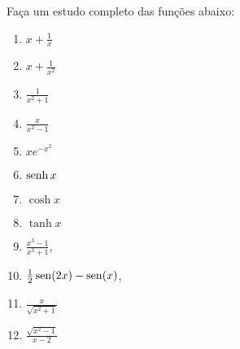 \begin{exo}\label{Exo:EstudosBasicos}
Faça um estudo completo das funções abaixo:
\begin{multicols}{3}
\begin{enumerate}
\item\label{itEstBas1} $x+\frac{1}{x}$
\item\label{itEstBas6} $x+\frac{1}{x^2}$
\item\label{itEstBas9} $\frac{1}{x^2+1}$
\item\label{itEstBas2} $\frac{x}{x^2-1}$
\item\label{itEstBas3} $xe^{-x^2}$
\item\label{itEstBas7} $\operatorname{senh} x$
\item\label{itEstBas8} $\cosh x$
\item\label{itEstBas8t} $\tanh x$
\item\label{itEstBas13} $\frac{x^3-1}{x^3+1}$, 
\item\label{itEstBas14} $\tfrac12\operatorname{sen} (2x)-\operatorname{sen}(x)$, 
\item\label{itEstBas15} $\frac{x}{\sqrt{x^2+1}}$
\item\label{itEstFuncB30} $\frac{\sqrt{x^2-1}}{x-2}$
\end{enumerate}
\end{multicols}
\vspace{0.01cm}
\begin{sol}

\end{sol}
\end{exo}
